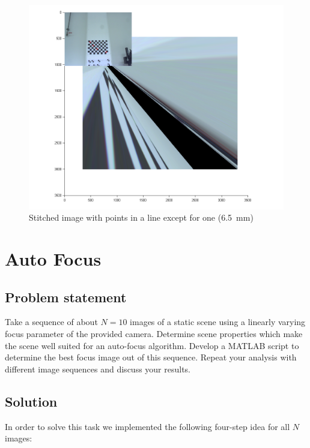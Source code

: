 \documentclass[
a4paper,     %
12pt         %
]{scrartcl}  %
\begin{document}
\begin{figure}[ht!]
 \centering
 \includegraphics[scale=0.4]{./Bildg_Messtechnik_Lab/PanoramaStitching/figb5.png}
 \caption{Stitched image with points in a line except for one (\SI{6.5}{mm})}
 \label{fig:lineareastitch}
\end{figure}

\pagebreak

\section{Auto Focus}

\subsection{Problem statement}

Take a sequence of about $N = 10$ images of a static scene using a linearly varying focus parameter of the
provided camera. Determine scene properties which make the scene well suited for an auto-focus algorithm.
Develop a MATLAB script to determine the best focus image out of this sequence. Repeat your analysis with
different image sequences and discuss your results.

\subsection{Solution}

In order to solve this task we implemented the following four-step idea for all $N$ images:
\end{document}
